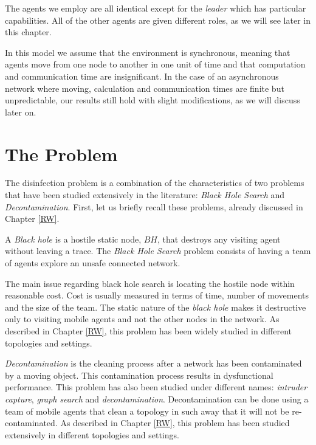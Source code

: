   The agents we employ are all identical except for the {\em leader} which has particular capabilities. All of the other agents are given different roles, as we will see later in this chapter. 

In this model we assume that the environment is synchronous, meaning that agents move from one node to another in one unit of time and that computation and communication time are insignificant. In the case of an asynchronous network where moving, calculation and communication times are finite but unpredictable, our results still hold with slight modifications, as we will discuss later on.



\section{The Problem} 


 The \bv disinfection problem is a combination of the characteristics of two problems that have been studied extensively in the literature: {\it Black Hole Search} and {\it Decontamination}. First, let us briefly recall these problems, already discussed in Chapter \ref{RW}.


   A {\em Black hole} is a  hostile static node, $BH$, that destroys any visiting agent without leaving a trace.
The {\it Black Hole Search} problem consists of having a team of agents explore  an unsafe connected network.

The main issue regarding black hole search  is locating the hostile node within reasonable cost. Cost is usually measured in terms of time, number of movements and the size of the team. The static nature of the {\it black hole} makes it destructive only to visiting mobile agents and not the other nodes in the network. As described in Chapter \ref{RW}, this problem has been widely studied in different topologies and settings.

 
  {\it Decontamination} is the cleaning process after a network has been contaminated by a moving object.
This contamination process results in dysfunctional performance. This problem  has also been studied under different names: {\it intruder capture}, {\it graph search} and {\it decontamination}. Decontamination can be done using a team of mobile agents that clean a topology in such away that it will not be re-contaminated. As described in Chapter \ref{RW}, this problem has been studied extensively in different topologies and settings.

